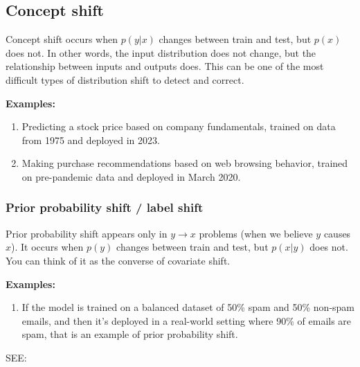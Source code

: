 \subsection{Concept shift}\label{Concept shift}
Concept shift occurs when $p(y|x)$ changes between train and test, but $p(x)$ does not. In other words, the input distribution does not change, but the relationship between inputs and outputs does. This can be one of the most difficult types of distribution shift to detect and correct.

\vspace{0.2cm}
\textbf{Examples:}
\begin{enumerate}
    \item Predicting a stock price based on company fundamentals, trained on data from 1975 and deployed in 2023.
    \item Making purchase recommendations based on web browsing behavior, trained on pre-pandemic data and deployed in March 2020.
\end{enumerate}

\subsubsection{Prior probability shift / label shift}\label{Prior probability shift / label shift}
Prior probability shift appears only in $y \to x$ problems (when we believe $y$ causes $x$). It occurs when $p(y)$ changes between train and test, but $p(x|y)$ does not. You can think of it as the converse of covariate shift.

\vspace{0.2cm}
\textbf{Examples:}
\begin{enumerate}
    \item If the model is trained on a balanced dataset of 50\% spam and 50\% non-spam emails, and then it’s deployed in a real-world setting where 90\% of emails are spam, that is an example of prior probability shift.
\end{enumerate}

SEE: 


















